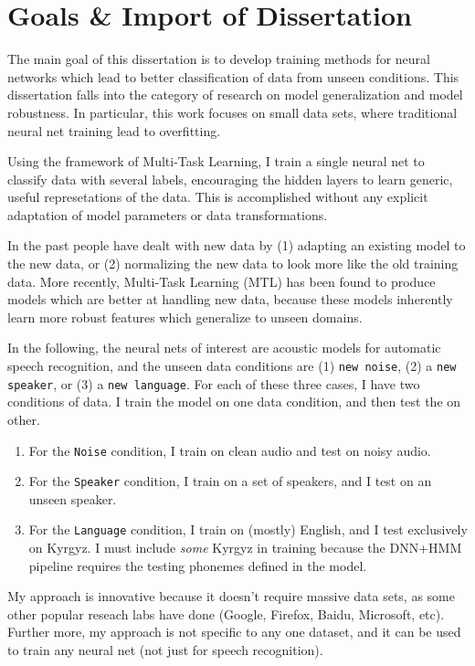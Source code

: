 \documentclass[10pt,a4paper]{article}
\begin{document}
\section{Goals \& Import of Dissertation}

The main goal of this dissertation is to develop training methods for neural networks which lead to better classification of data from unseen conditions. This dissertation falls into the category of research on model generalization and model robustness. In particular, this work focuses on small data sets, where traditional neural net training lead to overfitting.

Using the framework of Multi-Task Learning, I train a single neural net to classify data with several labels, encouraging the hidden layers to learn generic, useful represetations of the data. This is accomplished without any explicit adaptation of model parameters or data transformations.

In the past people have dealt with new data by (1) adapting an existing model to the new data, or (2) normalizing the new data to look more like the old training data. More recently, Multi-Task Learning (MTL) has been found to produce models which are better at handling new data, because these models inherently learn more robust features which generalize to unseen domains. 

In the following, the neural nets of interest are acoustic models for automatic speech recognition, and the unseen data conditions are (1) \texttt{new noise}, (2) a \texttt{new speaker}, or (3) a \texttt{new language}. For each of these three cases, I have two conditions of data. I train the model on one data condition, and then test the on other.

\begin{enumerate}
  
\item For the \texttt{Noise} condition, I train on clean audio and test on noisy audio.
\item For the \texttt{Speaker} condition, I train on a set of speakers, and I test on an unseen speaker.
\item For the \texttt{Language} condition, I train on (mostly) English, and I test exclusively on Kyrgyz. I must include \textit{some} Kyrgyz in training because the DNN+HMM pipeline requires the testing phonemes defined in the model.  
  
\end{enumerate}
    
My approach is innovative because it doesn't require massive data sets, as some other popular reseach labs have done (Google, Firefox, Baidu, Microsoft, etc). Further more, my approach is not specific to any one dataset, and it can be used to train any neural net (not just for speech recognition).
\end{document}
